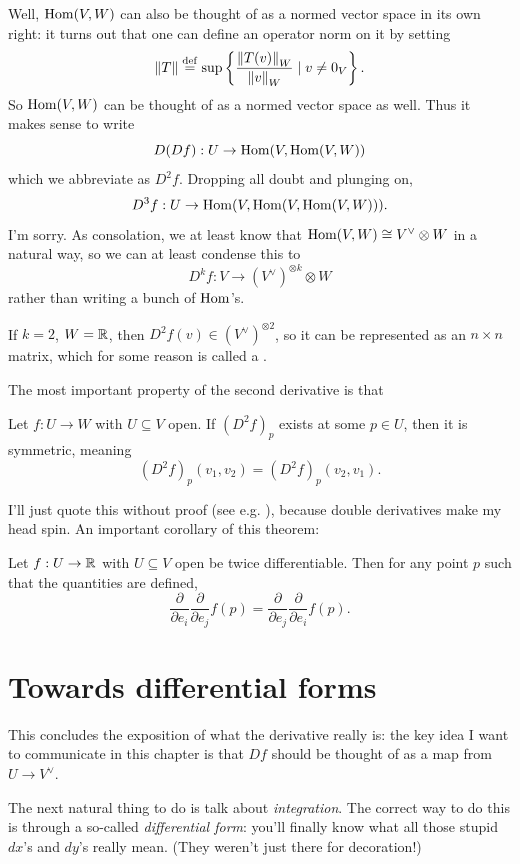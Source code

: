 Well, $\operatorname{Hom}(V,W)$ can also be thought of as a normed vector space in its own right:
it turns out that one can define an operator norm on it by setting
\[ \left\lVert T \right\rVert \overset{\mathrm{def}}{=} \sup \left\{ \frac{\left\lVert T(v) \right\rVert_W}{\left\lVert v \right\rVert_W} \mid v \neq 0_V \right\}. \] 
So $\operatorname{Hom}(V,W)$ can be thought of as a normed vector space as well.
Thus it makes sense to write
\[ D(Df) : U \to \operatorname{Hom}(V,\operatorname{Hom}(V,W)) \]
which we abbreviate as $D^2 f$. Dropping all doubt and plunging on,
\[ D^3f : U \to \operatorname{Hom}(V, \operatorname{Hom}(V,\operatorname{Hom}(V,W))). \]
I'm sorry.
As consolation, we at least know that $\operatorname{Hom}(V,W) \cong V^\vee \otimes W$ in a natural way,
so we can at least condense this to
\[ D^kf : V \to (V^\vee)^{\otimes k} \otimes W \]
rather than writing a bunch of $\operatorname{Hom}$'s.
\begin{remark}
	If $k=2$, $W = \mathbb R$, then $D^2f(v) \in (V^\vee)^{\otimes 2}$,
	so it can be represented as an $n \times n$ matrix,
	which for some reason is called a .
\end{remark}
The most important property of the second derivative is that
\begin{theorem}
	[Symmetry of $D^2 f$]
	Let $f : U \to W$ with $U \subseteq V$ open.
	If $(D^2f)_p$ exists at some $p \in U$, then it is symmetric, meaning
	\[ (D^2f)_p(v_1, v_2) = (D^2f)_p(v_2, v_1). \]
\end{theorem}
I'll just quote this without proof (see e.g. \cite[\S5, theorem 16]{ref:pugh}),
because double derivatives make my head spin.
An important corollary of this theorem:
\begin{corollary}
	Let $f : U \to \mathbb R$ with $U \subseteq V$ open be twice differentiable.
	Then for any point $p$ such that the quantities are defined,
	\[
		\frac{\partial}{\partial e_i}
		\frac{\partial}{\partial e_j}
		f(p)
		=
		\frac{\partial}{\partial e_j}
		\frac{\partial}{\partial e_i}
		f(p).
	\]
\end{corollary}

\section{Towards differential forms}
This concludes the exposition of what the derivative really is:
the key idea I want to communicate in this chapter is that $Df$
should be thought of as a map from $U \to V^\vee$.

The next natural thing to do is talk about \emph{integration}.
The correct way to do this is through a so-called \emph{differential form}:
you'll finally know what all those stupid $dx$'s and $dy$'s really mean.
(They weren't just there for decoration!)

